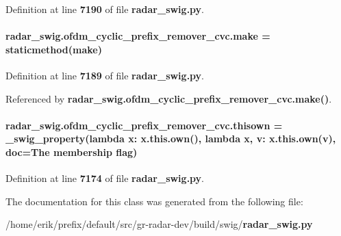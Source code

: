 Definition at line {\bf 7190} of file {\bf radar\+\_\+swig.\+py}.

\paragraph[{make}]{\setlength{\rightskip}{0pt plus 5cm}radar\+\_\+swig.\+ofdm\+\_\+cyclic\+\_\+prefix\+\_\+remover\+\_\+cvc.\+make = staticmethod(make)\hspace{0.3cm}{\ttfamily [static]}}\label{classradar__swig_1_1ofdm__cyclic__prefix__remover__cvc_a3cc44af4af422a4138b36923d96c90c9}


Definition at line {\bf 7189} of file {\bf radar\+\_\+swig.\+py}.



Referenced by {\bf radar\+\_\+swig.\+ofdm\+\_\+cyclic\+\_\+prefix\+\_\+remover\+\_\+cvc.\+make()}.

\paragraph[{thisown}]{\setlength{\rightskip}{0pt plus 5cm}radar\+\_\+swig.\+ofdm\+\_\+cyclic\+\_\+prefix\+\_\+remover\+\_\+cvc.\+thisown = {\bf \+\_\+swig\+\_\+property}(lambda x\+: x.\+this.\+own(), lambda {\bf x}, v\+: x.\+this.\+own(v), doc=\textquotesingle{}The membership flag\textquotesingle{})\hspace{0.3cm}{\ttfamily [static]}}\label{classradar__swig_1_1ofdm__cyclic__prefix__remover__cvc_a9560e21d59b73f26dcb6fe1ab611e7cb}


Definition at line {\bf 7174} of file {\bf radar\+\_\+swig.\+py}.



The documentation for this class was generated from the following file\+:\begin{DoxyCompactItemize}
\item 
/home/erik/prefix/default/src/gr-\/radar-\/dev/build/swig/{\bf radar\+\_\+swig.\+py}\end{DoxyCompactItemize}
